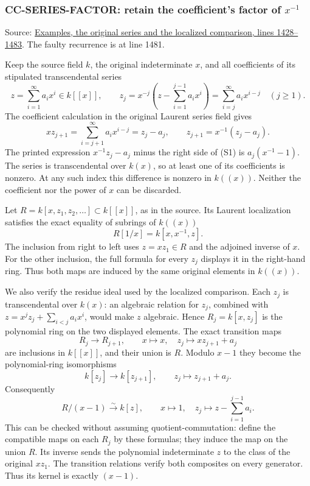 \subsubsection{\texorpdfstring{CC-SERIES-FACTOR: retain the coefficient's factor of \(x^{-1}\)}{CC-SERIES-FACTOR: retain the coefficient's factor of x\^{}\{-1\}}}\label{cc-series-factor-retain-the-coefficients-factor-of-x-1}

Source: \href{https://github.com/stacks/stacks-project/blob/a04446e57ec1fbc252a871afcec7752fb2807b14/examples.tex\#L1428}{Examples, the original series and the localized comparison, lines 1428--1483}. The faulty recurrence is at line 1481.

Keep the source field \(k\), the original indeterminate \(x\), and all coefficients of its stipulated transcendental series \[
 z=\sum_{i=1}^{\infty}a_i x^i\in k[[x]],\qquad
 z_j=x^{-j}\left(z-\sum_{i=1}^{j-1}a_i x^i\right)
     =\sum_{i=j}^{\infty}a_i x^{i-j}\quad(j\geq1).
\] The coefficient calculation in the original Laurent series field gives \[
 xz_{j+1}
 =\sum_{i=j+1}^{\infty}a_i x^{i-j}
 =z_j-a_j,\qquad
 z_{j+1}=x^{-1}(z_j-a_j).
\tag{S1}
\] The printed expression \(x^{-1}z_j-a_j\) minus the right side of (S1) is \(a_j(x^{-1}-1)\). The series is transcendental over \(k(x)\), so at least one of its coefficients is nonzero. At any such index this difference is nonzero in \(k((x))\). Neither the coefficient nor the power of \(x\) can be discarded.

Let \(R=k[x,z_1,z_2,\ldots]\subset k[[x]]\), as in the source. Its Laurent localization satisfies the exact equality of subrings of \(k((x))\) \[
 R[1/x]=k[x,x^{-1},z].
\tag{S2}
\] The inclusion from right to left uses \(z=xz_1\in R\) and the adjoined inverse of \(x\). For the other inclusion, the full formula for every \(z_j\) displays it in the right-hand ring. Thus both maps are induced by the same original elements in \(k((x))\).

We also verify the residue ideal used by the localized comparison. Each \(z_j\) is transcendental over \(k(x)\): an algebraic relation for \(z_j\), combined with \(z=x^jz_j+\sum_{i<j}a_i x^i\), would make \(z\) algebraic. Hence \(R_j=k[x,z_j]\) is the polynomial ring on the two displayed elements. The exact transition maps \[
 R_j\longrightarrow R_{j+1},\qquad
 x\longmapsto x,\quad z_j\longmapsto xz_{j+1}+a_j
\] are inclusions in \(k[[x]]\), and their union is \(R\). Modulo \(x-1\) they become the polynomial-ring isomorphisms \[
 k[z_j]\longrightarrow k[z_{j+1}],\qquad
 z_j\longmapsto z_{j+1}+a_j.
\] Consequently \[
 R/(x-1)\xrightarrow{\sim}k[z],\qquad
 x\longmapsto1,\quad
 z_j\longmapsto z-\sum_{i=1}^{j-1}a_i.
\tag{S3}
\] This can be checked without assuming quotient-commutation: define the compatible maps on each \(R_j\) by these formulas; they induce the map on the union \(R\). Its inverse sends the polynomial indeterminate \(z\) to the class of the original \(xz_1\). The transition relations verify both composites on every generator. Thus its kernel is exactly \((x-1)\).

